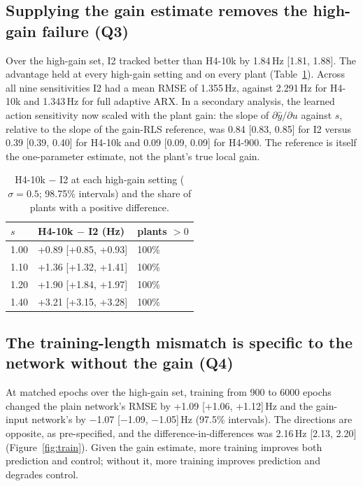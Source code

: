\documentclass[11pt]{article}
\newcommand{\Hz}{\,Hz}
\begin{document}
\subsection{Supplying the gain estimate removes the high-gain failure (Q3)}
Over the high-gain set, I2 tracked better than H4-10k by 1.84\Hz{} [1.81, 1.88]. The advantage held at every high-gain setting and on every plant (Table~\ref{tab:q3}). Across all nine sensitivities I2 had a mean RMSE of 1.355\Hz, against 2.291\Hz{} for H4-10k and 1.343\Hz{} for full adaptive ARX. In a secondary analysis, the learned action sensitivity now scaled with the plant gain: the slope of $\partial\hat y/\partial u$ against $s$, relative to the slope of the gain-RLS reference, was 0.84 [0.83, 0.85] for I2 versus 0.39 [0.39, 0.40] for H4-10k and 0.09 [0.09, 0.09] for H4-900. The reference is itself the one-parameter estimate, not the plant's true local gain.

\begin{table}[t]\centering\small
\caption{H4-10k $-$ I2 at each high-gain setting ($\sigma=0.5$; 98.75\% intervals) and the share of plants with a positive difference.}\label{tab:q3}
\begin{tabular}{@{}lll@{}}\toprule
$s$ & H4-10k $-$ I2 (Hz) & plants $>0$\\\midrule
1.00 & +0.89 [+0.85, +0.93] & 100\% \\
1.10 & +1.36 [+1.32, +1.41] & 100\% \\
1.20 & +1.90 [+1.84, +1.97] & 100\% \\
1.40 & +3.21 [+3.15, +3.28] & 100\% \\
\bottomrule\end{tabular}\end{table}

\subsection{The training-length mismatch is specific to the network without the gain (Q4)}
At matched epochs over the high-gain set, training from 900 to 6000 epochs changed the plain network's RMSE by +1.09 [+1.06, +1.12]\Hz{} and the gain-input network's by $-$1.07 [$-$1.09, $-$1.05]\Hz{} (97.5\% intervals). The directions are opposite, as pre-specified, and the difference-in-differences was 2.16\Hz{} [2.13, 2.20] (Figure~\ref{fig:train}). Given the gain estimate, more training improves both prediction and control; without it, more training improves prediction and degrades control.
\end{document}
